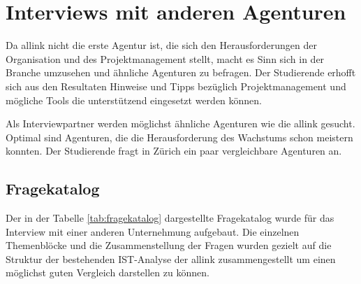 \section{Interviews mit anderen Agenturen}
Da allink nicht die erste Agentur ist, die sich den Herausforderungen der
Organisation und des Projektmanagement stellt, macht es Sinn sich in der Branche
umzusehen und ähnliche Agenturen zu befragen. Der Studierende erhofft sich aus
den Resultaten Hinweise und Tipps bezüglich Projektmanagement und mögliche
Tools die unterstützend eingesetzt werden können.

Als Interviewpartner werden möglichst ähnliche Agenturen wie die allink gesucht.
Optimal sind Agenturen, die die Herausforderung des Wachstums schon meistern
konnten. Der Studierende fragt in Zürich ein paar vergleichbare Agenturen an.

\subsection{Fragekatalog}
Der in der Tabelle \ref{tab:fragekatalog} dargestellte Fragekatalog wurde für 
das Interview mit einer anderen Unternehmung aufgebaut. Die einzelnen Themenblöcke 
und die Zusammenstellung der Fragen wurden gezielt auf die Struktur der bestehenden 
IST-Analyse der allink zusammengestellt um einen möglichst guten Vergleich darstellen 
zu können.

